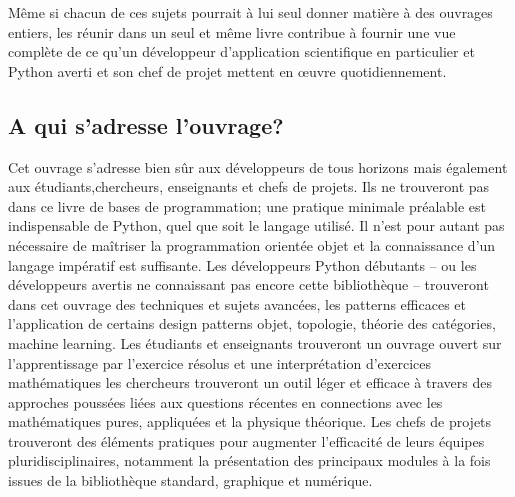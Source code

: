 Même si chacun de ces sujets pourrait à lui seul donner matière à des ouvrages entiers, les réunir dans 
un seul et même livre contribue à fournir une vue complète de ce qu’un développeur d'application 
scientifique en particulier et Python averti et son chef de projet mettent en œuvre quotidiennement.

\subsection*{A qui s'adresse l'ouvrage?}
Cet ouvrage s’adresse bien sûr aux développeurs de tous horizons mais également aux
étudiants,chercheurs, enseignants et chefs de projets. Ils ne trouveront pas dans ce livre de bases de 
programmation; une pratique minimale préalable est indispensable de Python, quel que soit le langage 
utilisé. Il n’est pour autant pas nécessaire de maîtriser la programmation orientée objet et 
la connaissance d’un langage impératif est suffisante.
Les développeurs Python débutants – ou les développeurs avertis ne connaissant pas
encore cette bibliothèque – trouveront dans cet ouvrage des techniques et sujets avancées, les patterns 
efficaces et l’application de certains design patterns objet, topologie, théorie des catégories, machine
learning.
Les étudiants et enseignants trouveront un ouvrage ouvert sur l'apprentissage par l'exercice résolus et 
une interprétation d’exercices mathématiques  
les chercheurs trouveront un outil léger et efficace à travers des approches poussées liées aux 
questions récentes en connections avec les mathématiques pures, appliquées et la physique théorique.
Les chefs de projets trouveront des éléments pratiques pour augmenter l’efficacité de
leurs équipes pluridisciplinaires, notamment la présentation des principaux modules à la fois issues de la bibliothèque standard, graphique et numérique.